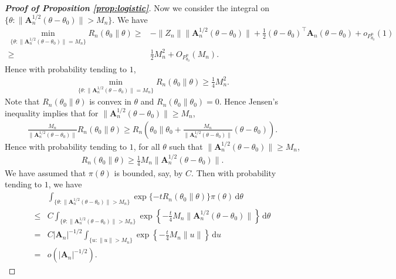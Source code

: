 \documentclass[11pt]{article}
\newcommand{\BA}{\mathbf{A}}    \newcommand{\BB}{\mathbf{B}}    \newcommand{\BC}{\mathbf{C}}    \newcommand{\BD}{\mathbf{D}}    \newcommand{\BE}{\mathbf{E}}    \newcommand{\BF}{\mathbf{F}}    \newcommand{\BG}{\mathbf{G}}    \newcommand{\BH}{\mathbf{H}}    \newcommand{\BI}{\mathbf{I}}    \newcommand{\BJ}{\mathbf{J}}    \newcommand{\BK}{\mathbf{K}}    \newcommand{\BL}{\mathbf{L}}
\newcommand{\myT}{\intercal}
\theoremstyle{plain}
\theoremstyle{definition}
\theoremstyle{remark}
\begin{document}
\begin{appendices}
\begin{proof}[\textbf{Proof of Proposition \ref{prop:logistic}}]
Now we consider the integral on $\{\theta : \|\BA_n^{1/2}(\theta - \theta_0)\| > M_n \}$.
We have
\begin{align*}
    \min_{\{\theta : \|\BA_n^{1/2}(\theta - \theta_0)\| = M_n\}} 
R_n (\theta_0 \| \theta )
\geq &
-\|Z_n\| \|\BA_n^{1/2} (\theta - \theta_0)\|
+ \frac{1} {2} 
(\theta - \theta_0)^\myT
\BA_n (\theta - \theta_0)
+ o_{P_{\theta_0}^n}(1)
\\
\geq &
 \frac{1} {2} M_n^2 + O_{P_{\theta_0}^n}(M_n)
.
\end{align*}
Hence with probability tending to $1$,
\begin{align*}
    \min_{\{\theta : \|\BA_n^{1/2}(\theta - \theta_0)\| = M_n\}} 
R_n (\theta_0 \| \theta )
\geq 
 \frac{1} {4} M_n^2
.
\end{align*}
Note that $R_n(\theta_0 \| \theta)$ is convex in $\theta$ and $R_n (\theta_0 \| \theta_0) = 0$.
Hence Jensen's inequality implies that for $\|\BA_n^{1/2}(\theta - \theta_0)\| \geq M_n$, 
\begin{align*}
    \frac{M_n}{\|\BA_n^{1/2}(\theta - \theta_0)\|} R_n (\theta_0 \| \theta )
    \geq R_n \left( \theta_0 \Big\| \theta_0 + \frac{M_n}{\|\BA_n^{1/2}(\theta - \theta_0)\|} (\theta - \theta_0)\right).
\end{align*}
Hence with probability tending to $1$, for all $\theta$ such that $\|\BA_n^{1/2}(\theta - \theta_0)\| \geq M_n$,
\begin{align*}
     R_n (\theta_0 \| \theta )
    \geq
    \frac 1 4 M_n
{\|\BA_n^{1/2}(\theta - \theta_0)\|}
    .
\end{align*}
We have assumed that $\pi(\theta)$ is bounded, say, by $C$.
Then with probability tending to $1$, we have
\begin{equation}\label{logistic:part2}
    \begin{split}
    &
    \int_{\{\theta : \|\BA_n^{1/2}(\theta - \theta_0)\| > M_n \}} 
    \exp\{-t R_n (\theta_0 \| \theta)\} \pi(\theta) \, \mathrm d \theta
    \\
    \leq&
    C
    \int_{\{\theta :  \|\BA_n^{1/2}(\theta - \theta_0)\| > M_n \}} 
    \exp \left\{-\frac{t}{4} M_n \|\BA_n^{1/2}(\theta - \theta_0)\| \right\}  \, \mathrm d \theta
    \\
    =&
    C
    |\BA_n|^{-1/2}
    \int_{\{u : \|u\| > M_n \}} 
    \exp \left\{-\frac{t}{4} M_n \| u \| \right\}  \, \mathrm d u
    \\
    =&
    o(
    |\BA_n|^{-1/2}
).
    \end{split}
\end{equation}


\end{proof}
\end{appendices}
\end{document}
